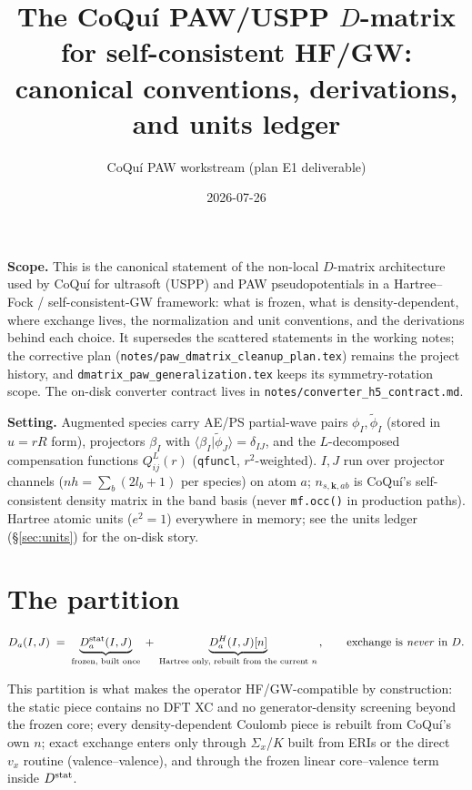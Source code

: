 \documentclass[11pt]{article}
\title{The CoQu\'i PAW/USPP $D$-matrix for self-consistent HF/GW:\\
canonical conventions, derivations, and units ledger}
\author{CoQu\'i PAW workstream (plan E1 deliverable)}
\date{2026-07-26}
\newcommand{\code}[1]{\texttt{#1}}
\newcommand{\file}[1]{\texttt{#1}}
\newcommand{\Dstat}{D^{\rm stat}}
\newcommand{\phit}{\tilde\phi}
\begin{document}
\maketitle

\noindent\textbf{Scope.} This is the canonical statement of the
non-local $D$-matrix architecture used by CoQu\'i for ultrasoft (USPP) and
PAW pseudopotentials in a Hartree--Fock / self-consistent-GW framework:
what is frozen, what is density-dependent, where exchange lives, the
normalization and unit conventions, and the derivations behind each choice.
It supersedes the scattered statements in the working notes; the corrective
plan (\file{notes/paw\_dmatrix\_cleanup\_plan.tex}) remains the project
history, and \file{dmatrix\_paw\_generalization.tex} keeps its
symmetry-rotation scope. The on-disk converter contract lives in
\file{notes/converter\_h5\_contract.md}.

\medskip
\noindent\textbf{Setting.} Augmented species carry AE/PS partial-wave pairs
$\phi_I,\phit_I$ (stored in $u=rR$ form), projectors $\beta_I$ with
$\langle\beta_I|\phit_J\rangle=\delta_{IJ}$, and the $L$-decomposed
compensation functions $Q^L_{ij}(r)$ (\code{qfuncl}, $r^2$-weighted).
$I,J$ run over projector channels ($nh = \sum_b (2l_b{+}1)$ per species) on
atom $a$; $n_{s,\mathbf{k},ab}$ is CoQu\'i's self-consistent density matrix
in the band basis (never \code{mf.occ()} in production paths). Hartree
atomic units ($e^2=1$) everywhere in memory; see the units ledger
(\S\ref{sec:units}) for the on-disk story.

\section{The partition}
\label{sec:partition}

\begin{keybox}
\begin{equation}
D_a(I,J)\;=\;\underbrace{\Dstat_a(I,J)}_{\text{frozen, built once}}
\;+\;\underbrace{D^{H}_a(I,J)[n]}_{\text{Hartree only, rebuilt from the
current }n}\,,
\qquad\text{exchange is \emph{never} in } D .
\end{equation}
\end{keybox}

\noindent This partition is what makes the operator HF/GW-compatible by
construction: the static piece contains no DFT XC and no generator-density
screening beyond the frozen core; every density-dependent Coulomb piece is
rebuilt from CoQu\'i's own $n$; exact exchange enters only through
$\Sigma_x$/$K$ built from ERIs or the direct $v_x$ routine (valence--valence),
and through the frozen linear core--valence term inside $\Dstat$.
\end{document}
